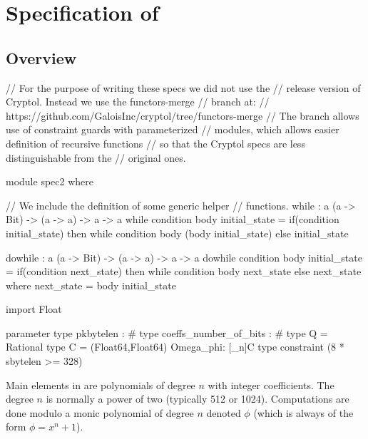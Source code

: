

\chapter{\texorpdfstring{Specification of \falcon}{Specification of Falcon}}\label{chap:spec}

\section{Overview}\label{sec:spec:overview}

\begin{code}
  // For the purpose of writing these specs we did not use the
  // release version of Cryptol. Instead we use the functors-merge
  // branch at:
  // https://github.com/GaloisInc/cryptol/tree/functors-merge
  // The branch allows use of constraint guards with parameterized
  // modules, which allows easier definition of recursive functions
  // so that the Cryptol specs are less distinguishable from the
  // original ones.
\end{code}

\begin{code}
  module spec2 where

  // We include the definition of some generic helper
  // functions.
  while : {a} (a -> Bit) -> (a -> a) -> a -> a
  while condition body initial_state =
    if(condition initial_state)
    then while condition body (body initial_state)
    else initial_state

  dowhile : {a} (a -> Bit) -> (a -> a) -> a -> a
  dowhile condition body initial_state =
    if(condition next_state)
    then while condition body next_state
    else next_state
      where next_state = body initial_state
\end{code}

\begin{code}
  import Float

  parameter
    type pkbytelen : #
    type coeffs_number_of_bits : #
    type Q = Rational
    type C = (Float64,Float64)
    Omega_phi: [_n]C
    type constraint (8 * sbytelen >= 328)
\end{code}

Main elements in \falcon are polynomials of degree $n$ with integer
coefficients. The degree $n$ is normally a power of two (typically 512 or
1024). Computations are done modulo a monic polynomial of degree $n$ denoted
$\phi$ (which is always of the form $\phi = x^n + 1$).

